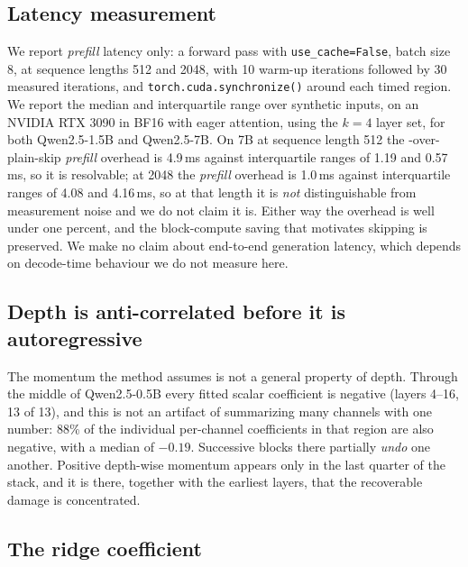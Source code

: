 \subsection{Latency measurement}
\label{sec:app-latency}

We report \emph{prefill} latency only: a forward pass with
\texttt{use\_cache=False}, batch size 8, at sequence lengths 512 and 2048,
with 10 warm-up iterations followed by 30 measured iterations, and
\texttt{torch.cuda.synchronize()} around each timed region. We report the median
and interquartile range over synthetic inputs, on an NVIDIA RTX 3090 in BF16 with eager
attention, using the  $k=4$ layer set, for both Qwen2.5-1.5B and
Qwen2.5-7B. On 7B at sequence length 512 the \mname-over-plain-skip \emph{prefill} overhead is
4.9\,ms against interquartile ranges of 1.19 and 0.57\,ms, so it is
resolvable; at 2048 the \emph{prefill} overhead is 1.0\,ms against interquartile ranges of
4.08 and 4.16\,ms, so at that length it is \emph{not} distinguishable from
measurement noise and we do not claim it is. Either way the overhead is well under one
percent, and the block-compute saving that motivates skipping is preserved. We make no
claim about end-to-end generation latency, which depends on decode-time behaviour we do
not measure here.

\subsection{Depth is anti-correlated before it is autoregressive}
\label{sec:app-anticorr}

The momentum the
method assumes is not a general property of depth. Through the middle of
Qwen2.5-0.5B every fitted scalar coefficient is negative (layers 4--16, 13 of
13), and this is not an artifact of summarizing many channels with one number:
88\% of the individual per-channel coefficients in that region are also
negative, with a median of $-0.19$. Successive blocks there partially
\emph{undo} one another. Positive depth-wise momentum appears only in the last
quarter of the stack, and it is there, together with the earliest layers, that
the recoverable damage is concentrated.

\subsection{The ridge coefficient}
\label{sec:app-ridge}

